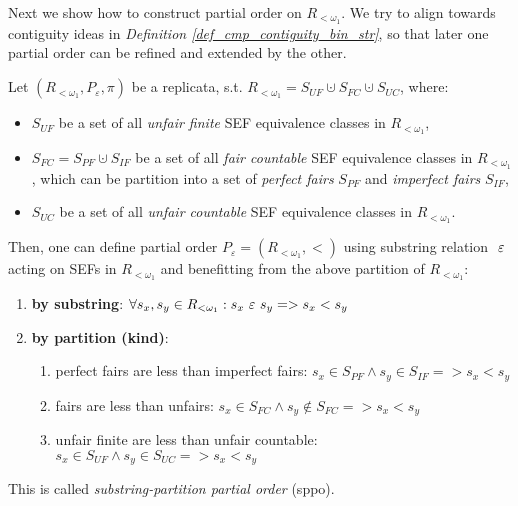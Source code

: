 Next we show how to construct partial order on $R_{<\omega_1}$. We try to align towards contiguity ideas in \textit{Definition \ref{def_cmp_contiguity_bin_str}}, so that later one partial order can be refined and extended by the other.

\begin{definition}\label{def_po_substr_rep}
  Let $(R_{<\omega_1}, P_{\varepsilon}, \pi)$ be a replicata, s.t. $R_{<\omega_1} = S_{UF} \cupdot S_{FC} \cupdot S_{UC}$, where:
  \begin{itemize}
    \item $S_{UF}$ be a set of all \textit{unfair finite} SEF equivalence classes in $R_{<\omega_1}$,
    \item $S_{FC} = S_{PF} \cupdot S_{IF} $ be a set of all \textit{fair countable} SEF equivalence classes in $R_{<\omega_1}$, which can be partition into a set of \textit{perfect fairs} $S_{PF}$ and \textit{imperfect fairs} $S_{IF}$,
    \item $S_{UC}$ be a set of all \textit{unfair countable} SEF equivalence classes in $R_{<\omega_1}$.
  \end{itemize}
  Then, one can define partial order $P_{\varepsilon} = (R_{<\omega_1}, <)$ using substring relation $\ \varepsilon\ $ acting on SEFs in $R_{<\omega_1}$ and benefitting from the above partition of $R_{<\omega_1}$:
  \begin{enumerate}[label=(\roman*)]
    \item \textbf{by substring}: $\forall s_x,s_y \in R_{<\omega_1}: s_x \ \varepsilon\  s_y => s_x < s_y$ 
    \item \textbf{by partition (kind)}:
      \begin{enumerate}[label=(\alph*)]
        \item perfect fairs are less than imperfect fairs: $s_x \in S_{PF} \land s_y \in S_{IF} => s_x < s_y$ 
        \item fairs are less than unfairs: $s_x \in S_{FC} \land s_y \notin S_{FC} => s_x < s_y$ 
        \item unfair finite are less than unfair countable: $s_x \in S_{UF} \land s_y \in S_{UC} => s_x < s_y$ 
      \end{enumerate}
  \end{enumerate}
  This is called \textit{substring-partition partial order} (sppo).
\end{definition}

